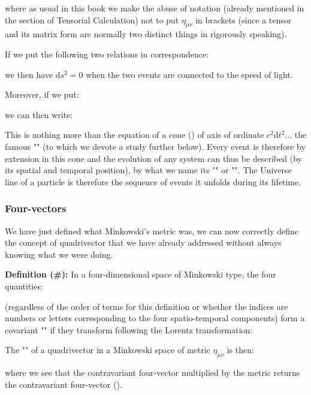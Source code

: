 	where as usual in this book we make the abuse of notation (already mentioned in the section of Tensorial Calculation) not to put $\eta_{\mu\nu}$ in brackets (since a tensor and its matrix form are normally two distinct things in rigorously speaking).

	If we put the following two relations in correspondence:
	
	we then have $\mathrm{d}s^2=0$ when the two events are connected to the speed of light.

	Moreover, if we put:
	
	we can then write:
	
	This is nothing more than the equation of a cone () of axis of ordinate $c^2\mathrm{d}t^2$... the famous "" (to which we devote a study further below). Every event is therefore by extension in this cone and the evolution of any system can thus be described (by its spatial and temporal position), by what we name its "" or "\label{world line}". The Universe line of a particle is therefore the sequence of events it unfolds during its lifetime.
	
	\subsubsection{Four-vectors}
	We have just defined what Minkowski's metric was, we can now correctly define the concept of quadrivector that we have already addressed without always knowing what we were doing.
	
	\textbf{Definition (\#\mydef):} In a four-dimensional space of Minkowski type, the four quantities:
	
	(regardless of the order of terms for this definition or whether the indices are numbers or letters corresponding to the four spatio-temporal components) form a covariant "" if they transform following the Lorentz transformation:	
	
	The "" of a quadrivector in a Minkowski space of metric $\eta_{\mu\nu}$ is then:
	
	where we see that the contravariant four-vector multiplied by the metric returns the contravariant four-vector ().


